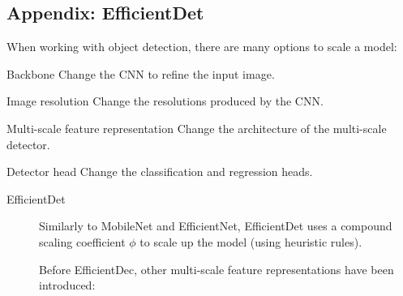 \begin{subappendices}
    \section{Appendix: EfficientDet}
        \begin{remark}
            When working with object detection, there are many options to scale a model:
            \begin{descriptionlist}
                \item[Backbone] Change the CNN to refine the input image.
                \item[Image resolution] Change the resolutions produced by the CNN.
                \item[Multi-scale feature representation] Change the architecture of the multi-scale detector.
                \item[Detector head] Change the classification and regression heads.
            \end{descriptionlist}
        \end{remark}

        \begin{description}
            \item[EfficientDet] 
                Similarly to MobileNet and EfficientNet, EfficientDet uses a compound scaling coefficient $\phi$ to scale up the model (using heuristic rules).

                \begin{remark}
                    Before EfficientDec, other multi-scale feature representations have been introduced:


\end{remark}
\end{description}
\end{subappendices}
